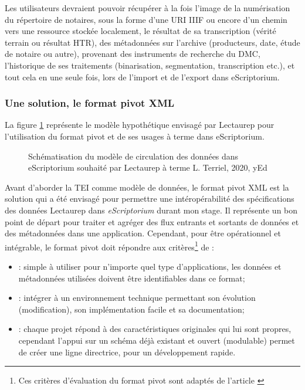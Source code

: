 Les utilisateurs devraient pouvoir récupérer à la fois l'image de la numérisation du répertoire de notaires, sous la forme d'une URI IIIF ou encore d'un chemin vers une ressource stockée localement, le résultat de sa transcription (vérité terrain ou résultat HTR), des métadonnées sur l'archive (producteurs, date, étude de notaire ou autre), provenant des instruments de recherche du DMC, l'historique de ses traitements (binarisation, segmentation, transcription etc.), et tout cela en une seule fois, lors de l'import et de l'export dans eScriptorium.    

\subsubsection{Une solution, le format pivot XML}
La figure \ref{fig:modèle_métadonnées_vise_V4} représente le modèle hypothétique envisagé par Lectaurep pour l'utilisation du format pivot et de ses usages à terme dans eScriptorium. \\
\begin{figure}[h]
    \centering
    \centerline{}
    \caption{Schématisation du modèle de circulation des données dans eScriptorium souhaité par Lectaurep à terme  \textcopyright L. Terriel, 2020, yEd}
    \label{fig:modèle_métadonnées_vise_V4}
\end{figure}

Avant d'aborder la TEI comme modèle de données, le format pivot XML est la solution qui a été envisagé pour permettre une intéropérabilité des spécifications des données Lectaurep dans \textit{eScriptorium} durant mon stage. Il représente un bon point de départ pour traiter et agréger des flux entrants et sortants de données et des métadonnées dans une application. Cependant, pour être opérationnel et intégrable, le format pivot doit répondre aux critères\footnote{Ces critères d'évaluation du format pivot sont adaptés de l'article \cite{crozat_standardisation_2006}} de : 

\begin{itemize}
    \item {} : simple à utiliser pour n'importe quel type d'applications, les données et métadonnées utilisées doivent être identifiables dans ce format;
    \item {} : intégrer à un environnement technique permettant son évolution (modification), son implémentation facile et sa documentation;
    \item {} : chaque projet répond à des caractéristiques originales qui lui sont propres, cependant l'appui sur un schéma déjà existant et ouvert (modulable) permet de créer une ligne directrice, pour un développement rapide.
\end{itemize}

